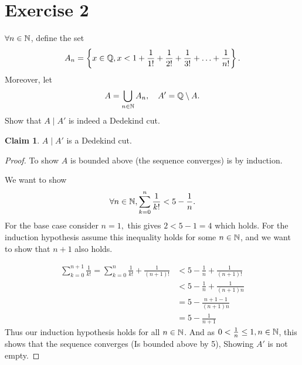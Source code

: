 \documentclass{homework}
\newcommand{\nil}{\varnothing}
\newcommand{\Q}{\bb{Q}} %
\newcommand{\N}{\bb{N}} %
\newcommand{\?}{\stackrel{?}{=}}
\newcommand{\ep}{\varepsilon}
\theoremstyle{definition}
\newtheorem*{claim}{Claim}
\begin{document}
\section*{Exercise 2}
$\forall n\in \N$, define the set $$A_n=\left\{x\in\Q, x<1+\frac1{1!}+\frac1{2!}+\frac1{3!}+\ldots+\frac1{n!}\right\}.$$ Moreover, let $$A=\bigcup_{n\in\N}A_n,\quad A'=\Q\setminus A.$$
\question[1] Show that $A\mid A'$ is indeed a Dedekind cut.
\begin{claim}
    $A\mid A'$ is a Dedekind cut.
\end{claim}
\begin{proof} 






To show $A$ is bounded above (the sequence converges) is by induction. 

We want to show $$\forall n\in\N, \sum_{k=0}^n\frac1{k!}<5-\frac1n.$$ For the base case consider $n=1, $ this gives $2<5-1=4$ which holds. For the induction hypothesis assume this inequality holds for some $n\in\N$, and we want to show that $n+1$ also holds. 

\begin{align*}
    \sum_{k=0}^{n+1}\frac{1}{k!}=\sum_{k=0}^n\frac{1}{k!}+\frac{1}{(n+1)!}&<5-\frac{1}{n}+\frac{1}{(n+1)!}\\
    &<5-\frac1n+\frac{1}{(n+1)n}\\
    &=5-\frac{n+1-1}{(n+1)n}\\
    &=5-\frac1{n+1}
\end{align*}
Thus our induction hypothesis holds for all $n\in\N$. And as \(0<\frac1n\leq1,n\in\N\), this shows that the sequence converges (Is bounded above by 5), Showing $A'$ is not empty.  


\end{proof}
\end{document}
